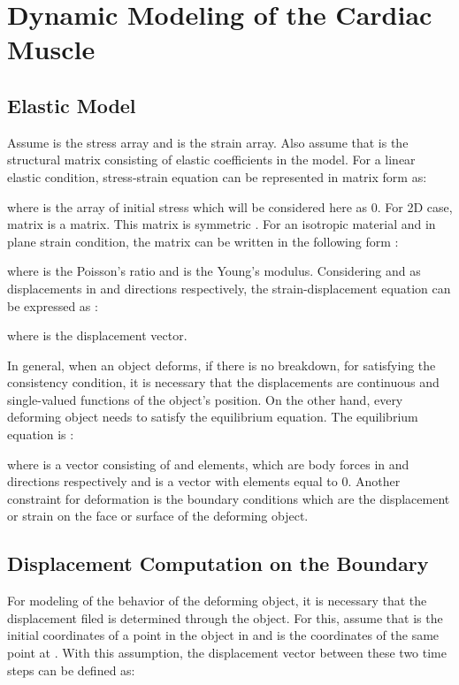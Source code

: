 \documentclass{jicspack}
\begin{document}
\section{Dynamic Modeling of the Cardiac Muscle}
\subsection{Elastic Model}
Assume  is the stress array and  is the strain array. Also assume that  is the
structural matrix consisting of elastic coefficients in the model. For a linear elastic condition,
stress-strain equation can be represented in matrix form as:

where  is the array of initial stress which will be considered here as 0. For 2D case, matrix  is a  matrix. This matrix is symmetric . For an isotropic material and in plane strain condition, the matrix can be written in the following form \cite{21}:

where  is the Poisson's ratio and  is the Young's modulus. Considering  and  as displacements in  and  directions respectively, the strain-displacement
equation can be expressed as \cite{22}: 


where  is the displacement vector. 

In general, when an object deforms, if there is no breakdown, for satisfying the consistency
condition, it is necessary that the displacements are continuous and single-valued functions
of the object's position. On the other hand, every deforming object needs to satisfy the
equilibrium equation. The equilibrium equation is \cite{22}: 

where  is a vector consisting of  and  elements, which are body forces in  and 
directions respectively and  is a vector with elements equal to 0. Another constraint for deformation is the boundary conditions which are the displacement or strain on the face or surface of the deforming object.



\subsection{Displacement Computation on the Boundary}
For modeling of the behavior of the deforming object, it is necessary that the displacement
filed is determined through the object. For this, assume that  is the initial coordinates of a point in the object in  and  is the coordinates of the same point at . With this assumption, the displacement vector between these two time steps can be defined as: 
\end{document}
